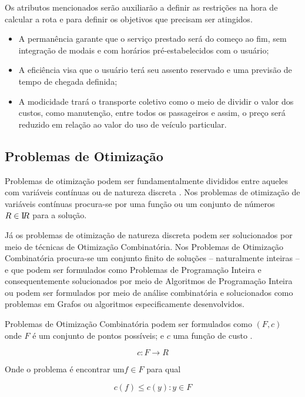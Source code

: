 Os atributos mencionados serão auxiliarão a definir as restrições na hora de calcular a rota e para definir os objetivos que precisam ser atingidos.

\begin{itemize}
\item A permanência garante que o serviço prestado será do começo ao fim, sem integração de modais e com horários pré-estabelecidos com o usuário;
\item A eficiência visa que o usuário terá seu assento reservado e uma previsão de tempo de chegada definida;
\item A modicidade trará o transporte coletivo como o meio de dividir o valor dos custos, como manutenção, entre todos os passageiros e assim, o preço será reduzido em relação ao valor do uso de veículo particular.
\end{itemize}



\subsection{Problemas de Otimização}\label{problemas-de-otimizacao}

Problemas de otimização podem ser fundamentalmente divididos entre aqueles com variáveis contínuas ou de natureza discreta \cite{combinatorial-optimization}. Nos problemas de otimização de variáveis contínuas procura-se por uma função ou um conjunto de números \(R \in \textrm I\!R \) para a solução.

Já os problemas de otimização de natureza discreta podem ser solucionados por meio de técnicas de Otimização Combinatória. Nos Problemas de Otimização Combinatória procura-se um conjunto finito de soluções -- naturalmente inteiras -- e que podem ser formulados como Problemas de Programação Inteira e consequentemente solucionados por meio de Algoritmos de Programação Inteira \cite{goldbarg} ou podem ser formulados por meio de análise combinatória e solucionados como problemas em Grafos ou algoritmos especificamente desenvolvidos.


Problemas de Otimização Combinatória podem ser formulados como \((F, c)\) onde \(F\) é um conjunto de pontos possíveis; e \(c\) uma função de custo \cite{rodolfo}.

\[c: F \longrightarrow R \]

Onde o problema é encontrar um\(f \in F\) para qual

\[c(f) \leq c(y): y \in F \]

